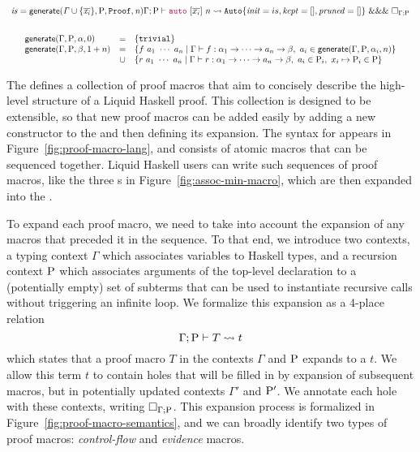 \begin{figure*}
\begin{minipage}{\textwidth}
\[\begin{array}{c}
{   \mathit{is = \mathsf{generate} (\Gamma \cup \{ \overline{x_i} \}, \mathrm{P}, \ensuremath{\mathtt{Proof}}, n)}}
            {\Gamma; \mathrm{P}\vdash {\color{purple}\ensuremath{\mathtt{auto}}} ~ [\overline{x_i}] ~ n \rightsquigarrow\mathtt{Auto} \{ \mathit{init} = is, \mathit{kept} = [], \mathit{pruned} = [] \}~ \ensuremath{\mathtt{\&\&\&}} ~ \Box_{\Gamma ; \mathrm{P}}}
\\[2em]
  \begin{array}{lcl}
    \mathsf{generate}(\Gamma, \mathrm{P}, \alpha, 0) &=& \{ \mathtt{trivial} \}
    \\
    \mathsf{generate}(\Gamma, \mathrm{P}, \beta, 1 + n) &=&
      \{ f ~ a_1 ~ \cdots ~ a_n \mid
        \Gamma \vdash f : \alpha_1 \rightarrow \cdots \rightarrow a_n \rightarrow \beta,~
        a_i \in \mathsf{generate}(\Gamma, \mathrm{P}, \alpha_i, n)
      \}
      \\ &\cup&
      \{ r ~ a_1 ~ \cdots ~ a_n \mid
        \Gamma \vdash r : \alpha_1 \rightarrow \cdots \rightarrow a_n \rightarrow \beta,~
        a_i \in \mathrm{P}_i,~
        x_i \mapsto \mathrm{P}_i \in \mathrm{P}
      \}
      \\ 
  \end{array}
\end{array} \]
\end{minipage}
\caption{Proof macro semantics}
\label{fig:proof-macro-semantics}
\end{figure*}


The \LangA defines a collection of proof macros that aim to concisely
describe the high-level structure of a Liquid Haskell proof. This
collection is designed to be extensible, so that new proof macros can
be added easily by adding a new constructor to the \LangA and then
defining its expansion.  The syntax for \LangA appears in
Figure~\ref{fig:proof-macro-lang}, and consists of atomic macros that
can be sequenced together. Liquid Haskell users can write such
sequences of proof macros, like the three s in
Figure~\ref{fig:assoc-min-macro}, which are then expanded into the
\LangB.


To expand each proof macro, we need to take into account the expansion
of any macros that preceded it in the sequence. To that end, we
introduce two contexts, a typing context $\Gamma$ which associates
variables to Haskell types, and a recursion context $\mathrm{P}$ which
associates arguments of the top-level declaration to a (potentially
empty) set of subterms that can be used to instantiate recursive calls
without triggering an infinite loop.  We formalize this expansion as a
4-place relation
\[
\Gamma; \mathrm{P} \vdash T \rightsquigarrow t
\]
which states that a proof macro $T$ in the contexts $\Gamma$ and
$\mathrm{P}$ expands to a \LangBTerm $t$. We allow this term $t$ to contain
holes that will be filled in by expansion of subsequent macros, but in
potentially updated contexts $\Gamma'$ and $\mathrm{P}'$. We annotate each
hole with these contexts, writing $\Box_{\Gamma ; \mathrm{P}}$.  This
expansion process is formalized in
Figure~\ref{fig:proof-macro-semantics}, and we can broadly identify
two types of proof macros: {\em control-flow} and {\em evidence}
macros.

